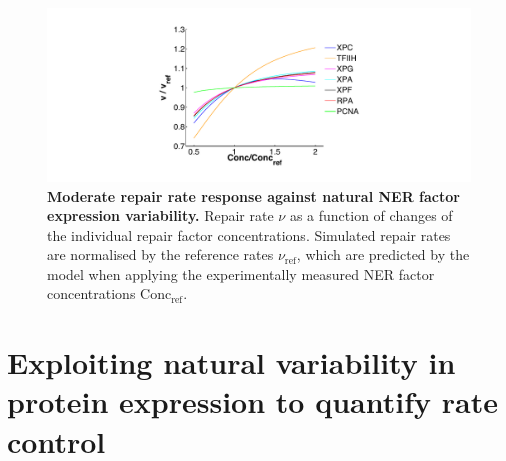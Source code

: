 \begin{figure}[htbp]
	\begin{center}
		\includegraphics[width=1\textwidth]{Abbildungen/figure3_1_b.pdf}
		\caption{\textbf{Moderate repair rate response against natural NER factor expression variability.} Repair rate $\nu$ as a function of changes of the individual repair factor concentrations. Simulated repair rates are normalised by the reference rates $\nu_{\text{ref}}$, which are predicted by the model when applying the experimentally measured NER factor concentrations $\text{Conc}_{\text{ref}}$.} 
		\label{fig:R_largeProteinVariation}
	\end{center}
\end{figure}


\section{Exploiting natural variability in protein expression to quantify rate control}
\label{natural_Variability_m}


